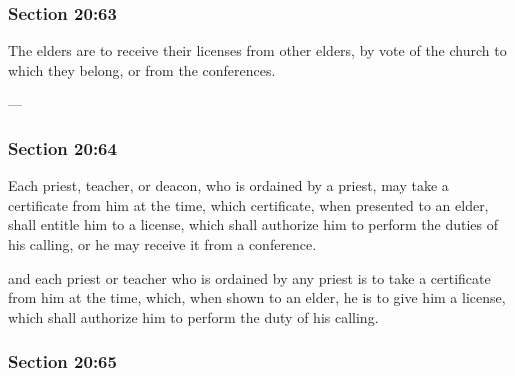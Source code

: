 	\subsubsection{Section 20:63} %
		\label{DC20-63}

		The elders are to receive their licenses from other elders, by vote of the church to which they belong, or from the conferences.

		\begin{framed}
		\scriptsize
			\begin{compactdesc}
				\item[JSP] ---
				\item[RB1] 
				\item[BC] 
			\end{compactdesc}
		\end{framed}

	\subsubsection{Section 20:64} %
		\label{DC20-64}

		Each priest, teacher, or deacon, who is ordained by a priest, may take a certificate from him at the time, which certificate, when presented to an elder, shall entitle him to a license, which shall authorize him to perform the duties of his calling, or he may receive it from a conference.

		\begin{framed}
		\scriptsize
			\begin{compactdesc}
				\item[JSP] and each priest or teacher who is ordained by any priest is to take a certificate from him at the time, which, when shown to an elder, he is to give him a license, which shall authorize him to perform the duty of his calling. 
				\item[RB1] 
				\item[BC] 
			\end{compactdesc}
		\end{framed}

	\subsubsection{Section 20:65} %
		\label{DC20-65}


